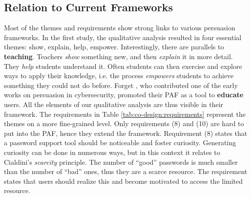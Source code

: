 \subsection{Relation to Current Frameworks}
Most of the themes and requirements show strong links to various persuasion frameworks. In the first study, the qualitative analysis resulted in four essential themes: show, explain, help, empower. Interestingly, there are parallels to \textbf{teaching}. Teachers \textit{show} something new, and then \textit{explain} it in more detail. They \textit{help} students understand it. Often students can then exercise and explore ways to apply their knowledge, i.e. the process \textit{empowers} students to achieve something they could not do before. Forget \etal, who contributed one of the early works on persuasion in cybersecurity, promoted their \acrlong{PAF} as a tool to \textbf{educate} users. All the elements of our qualitative analysis are thus visible in their framework. The requirements in Table \ref{tab:co-design:requirements} represent the themes on a more fine-grained level. Only requirements (8) and (10) are hard to put into the PAF, hence they extend the framework.  
Requirement (8) states that a password support tool should be noticeable and foster curiosity. Generating curiosity can be done in numerous ways, but in this context it relates to Cialdini's \textit{scarcity} principle. The number of ``good'' passwords is much smaller than the number of ``bad'' ones, thus they are a scarce resource. The requirement states that users should realize this and become motivated to access the limited resource. %

